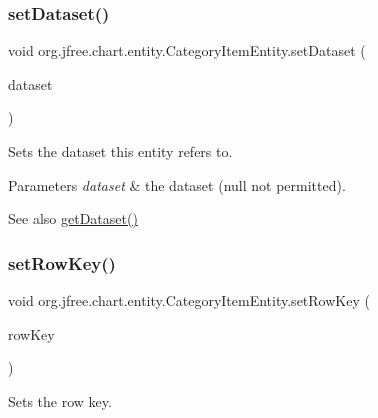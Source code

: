 \subsubsection{\texorpdfstring{set\+Dataset()}{setDataset()}}
{\footnotesize\ttfamily void org.\+jfree.\+chart.\+entity.\+Category\+Item\+Entity.\+set\+Dataset (\begin{DoxyParamCaption}\item[{\mbox{\hyperlink{interfaceorg_1_1jfree_1_1data_1_1category_1_1_category_dataset}{Category\+Dataset}}}]{dataset }\end{DoxyParamCaption})}

Sets the dataset this entity refers to.


\begin{DoxyParams}{Parameters}
{\em dataset} & the dataset ({\ttfamily null} not permitted).\\
\hline
\end{DoxyParams}
\begin{DoxySeeAlso}{See also}
\mbox{\hyperlink{classorg_1_1jfree_1_1chart_1_1entity_1_1_category_item_entity_a17dc2014d109ea945c31413476db9eff}{get\+Dataset()}} 
\end{DoxySeeAlso}
\mbox{\label{classorg_1_1jfree_1_1chart_1_1entity_1_1_category_item_entity_ab9e5d63db61fe4152a86acc4de0d5b72}} 
\subsubsection{\texorpdfstring{set\+Row\+Key()}{setRowKey()}}
{\footnotesize\ttfamily void org.\+jfree.\+chart.\+entity.\+Category\+Item\+Entity.\+set\+Row\+Key (\begin{DoxyParamCaption}\item[{Comparable}]{row\+Key }\end{DoxyParamCaption})}

Sets the row key.



